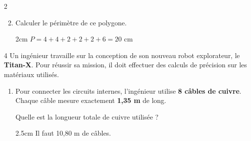 \documentclass[a4paper]{book}
\begin{document}
{\begin{exerciceNote}{2}
\begin{minipage}{0.45\linewidth}
        \end{minipage}

        \begin{enumerate}
            \setcounter{enumi}{1}
            \item Calculer le périmètre de ce polygone.
    
            \begin{ZoneReponse}{2cm}               
                \quad $P=4+4+2+2+2+6=20$ cm
            \end{ZoneReponse}
        \end{enumerate}
    \end{exerciceNote}


    \begin{exerciceNote}{4}
        Un ingénieur travaille sur la conception de son nouveau robot explorateur, le \textbf{Titan-X}. Pour réussir sa mission, il doit effectuer des calculs de précision sur les matériaux utilisés.

        \begin{enumerate}[leftmargin=*]
            \item Pour connecter les circuits internes, l'ingénieur utilise \textbf{8 câbles de cuivre}. Chaque câble mesure exactement \textbf{1,35 m} de long.

            Quelle est la longueur totale de cuivre utilisée ?

            \begin{ZoneReponse}{2.5cm}
                 \hspace{2cm} Il faut 10,80 m de câbles.
            \end{ZoneReponse}


\end{enumerate}
\end{exerciceNote}}
\end{document}
